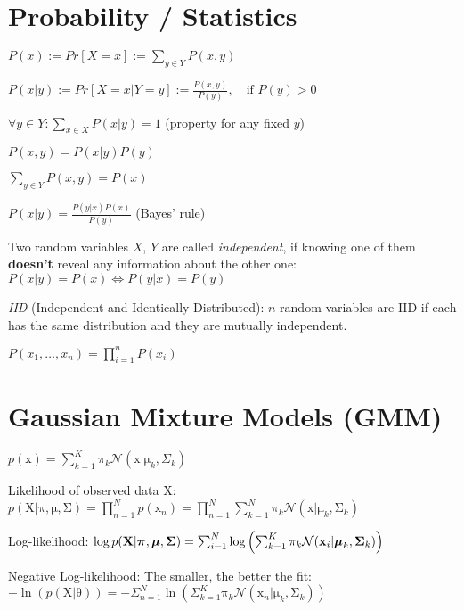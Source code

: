 \documentclass[a4paper, 11pt, landscape]{article}
\newcommand{\matr}[1]{\boldsymbol{\mathrm{#1}}}
\begin{document}
\begin{multicols*}{3}
\section{Probability / Statistics}
\begin{compactitem}
	\item $P(x) := Pr[X = x] := \sum_{y \in Y} P(x, y)$
	\item $P(x|y) := Pr[X = x | Y = y] := \frac{P(x,y)}{P(y)},\quad \text{if } P(y) > 0$
	\item $\forall y \in Y: \sum_{x \in X} P(x|y) = 1$ (property for any fixed $y$)
	\item $P(x, y) = P(x|y) P(y)$
	\item $\sum_{y \in Y} P(x, y) = P(x)$
	\item $P(x|y) = \frac{P(y|x)P(x)}{P(y)}$ (Bayes' rule)
	\item Two random variables $X$, $Y$ are called \emph{independent}, if knowing one of them \textbf{doesn't} reveal any information about the other one: $P(x|y) = P(x) \Leftrightarrow P(y|x) = P(y)$
	\item \emph{IID} (Independent and Identically Distributed): $n$ random variables are IID if each has the same distribution and they are mutually independent.
	\begin{compactitem}
		\item $P(x_1, \ldots, x_n) = \prod_{i=1}^n P(x_i)$
	\end{compactitem}
\end{compactitem}

\section{Gaussian Mixture Models (GMM)}
\begin{compactdesc}
	\item[] $p(\matr{x}) = \sum_{k=1}^K \pi_k \mathcal{N}(\matr{x} | \matr{\mu}_k, \Sigma_k)$
	\item[Likelihood of observed data $\matr{X}$:] $p(\matr{X} | \matr{\pi}, \matr{\mu}, \matr{\Sigma}) = \prod_{n=1}^N p(\matr{x}_n) = \prod_{n=1}^N \sum_{k=1}^N \pi_k \mathcal{N}(\matr{x} | \matr{\mu}_k, \matr{\Sigma}_k)$
	\item[Log-likelihood:] $\log p(\matr{X} | \matr{\pi}, \matr{\mu}, \matr{\Sigma}) =\break \sum_{i=1}^N \log \left( \sum_{k=1}^K \pi_k \mathcal{N}(\matr{x}_i | \matr{\mu}_k, \matr{\Sigma}_k) \right)$
	\item[Negative Log-likelihood:] The smaller, the better the fit: $-\ln(p(\matr{X} | \matr{\theta})) = -\Sigma_{n=1}^N \ln\left( \Sigma_{k=1}^K \matr{\pi}_k \mathcal{N}(\matr{x}_n | \matr{\mu}_k, \matr{\Sigma}_k) \right)$
\end{compactdesc}


\end{multicols*}
\end{document}
